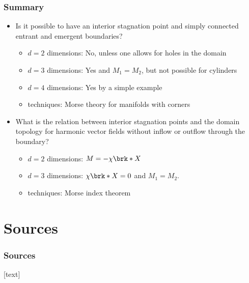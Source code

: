 \begin{frame}
  \frametitle{Summary}
  \begin{itemize}
    \item Is it possible to have an interior stagnation point and simply connected entrant and emergent boundaries?
      \begin{itemize}
        \item $d=2$ dimensions: No, unless one allows for holes in the domain
        \item $d=3$ dimensions: Yes and $M_1=M_2$, but not possible for cylinders
        \item $d=4$ dimensions: Yes by a simple example
        \item techniques: Morse theory for manifolds with corners
      \end{itemize}
    \item What is the relation between interior stagnation points and the domain topology for harmonic vector fields without inflow or outflow through the boundary?
      \begin{itemize}
        \item $d=2$ dimensions: $M=-\chi\brk*{X}$
        \item $d=3$ dimensions: $\chi\brk*{X}=0$ and $M_1=M_2$.
        \item techniques: Morse index theorem
      \end{itemize}
  \end{itemize}
\end{frame}


\section{Sources}

\begin{frame}[allowframebreaks]
	\frametitle{Sources}
	\nocite{*}

	[text]
	\printbibliography
\end{frame}

